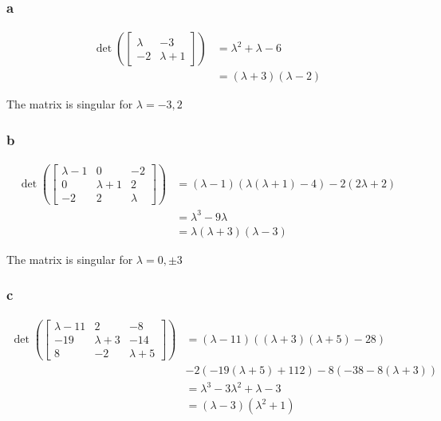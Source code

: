 \documentclass[12pt,letterpaper]{article}
\theoremstyle{definition}
\begin{document}
\subsubsection*{a}

\begin{align*}
  \det \left( \begin{bmatrix}
    \lambda & -3 \\
    -2 & \lambda + 1
  \end{bmatrix} \right) &= \lambda^2 + \lambda - 6 \\
            &= (\lambda + 3)(\lambda - 2)
\end{align*}

The matrix is singular for $\lambda  = -3, 2$

\subsubsection*{b}

\begin{align*}
  \det \left( \begin{bmatrix}
      \lambda - 1 & 0 & -2 \\
      0 & \lambda + 1 & 2 \\
      -2 & 2 & \lambda
    \end{bmatrix} \right) &= (\lambda - 1)(\lambda(\lambda + 1) - 4) - 2(2\lambda + 2)\\
                  &= \lambda^3 - 9\lambda\\
                  &= \lambda(\lambda + 3)(\lambda - 3)
\end{align*}

The matrix is singular for $\lambda  = 0, \pm 3$

\subsubsection*{c}
\begin{align*}
  \det \left( \begin{bmatrix}
      \lambda - 11 & 2 & -8 \\
      -19 & \lambda + 3 & -14 \\
      8 & -2 & \lambda + 5
    \end{bmatrix} \right) &= (\lambda - 11)((\lambda + 3)(\lambda + 5) - 28) \\
                   & -2(-19(\lambda + 5) + 112) -8(-38 - 8(\lambda + 3))\\
                   &= \lambda^3 -3\lambda^2+\lambda-3 \\
                  &= (\lambda-3)(\lambda^2+1)
\end{align*}
\end{document}
